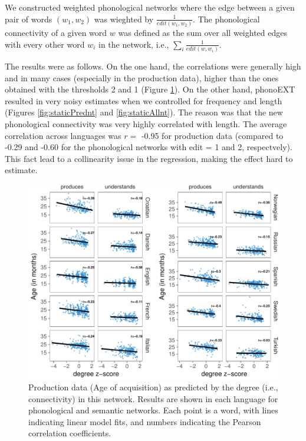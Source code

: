\documentclass[english,floatsintext,man]{apa6}
\theoremstyle{definition}
\theoremstyle{definition}
\theoremstyle{definition}
\theoremstyle{remark}
\begin{document}
We constructed weighted phonological networks where the edge between a
given pair of words \((w_1, w_2)\) was wieghted by
\(\frac{1}{edit(w_1,w_2)}\). The phonological connectivity of a given
word \(w\) was defined as the sum over all weighted edges with every
other word \(w_i\) in the network, i.e.,
\(\sum_{i} \frac{1}{edit(w,w_i)}\).

The results were as follows. On the one hand, the correlations were
generally high and in many cases (especially in the production data),
higher than the ones obtained with the thresholds 2 and 1 (Figure
\ref{fig:corrPlotnt}). On the other hand, phonoEXT resulted in very
noisy estimates when we controlled for frequency and length (Figures
\ref{fig:staticPrednt} and \ref{fig:staticAllnt}). The reason was that
the new phonological connectivity was very highly correlated with
length. The average correlation across languages was \(r =\) -0.95 for
production data (compared to -0.29 and -0.60 for the phonological
networks with edit = 1 and 2, respectvely). This fact lead to a
collinearity issue in the regression, making the effect hard to
estimate.

\begin{figure}[!h]
\includegraphics[width=\textwidth]{ms_files/figure-latex/corrPlotnt-1} \caption{Production data (Age of acquisition) as predicted by the degree (i.e., connectivity) in this network. Results are shown in each language for phonological and semantic networks. Each point is a word, with lines indicating linear model fits, and numbers indicating the Pearson correlation coefficients.}\label{fig:corrPlotnt}
\end{figure}
\end{document}
